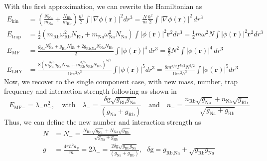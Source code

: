 With the first approximation, we can rewrite the Hamiltonian as
\begin{equation*}
\begin{split}
E_{\text{kin}}&=\left(\frac{N_{\text{Na}}}{m_{\text{Na}}} +\frac{N_{\text{Rb}}}{m_{\text{Rb}}}\right)\frac{\hbar ^2}{2}\int \left| \nabla \phi (\pmb{r})\right|^2 dr^3=\frac{N}{m} \frac{\hbar ^2}{2}\int \left| \nabla \phi (\pmb{r})\right| ^2 \, dr^3\\
E_{\text{trap}}&=\frac{1}{2}\left(m_{\text{Rb}} \omega _{\text{Rb}}^2N_{\text{Rb}}+m_{\text{Na}} \omega _{\text{Na}}^2N_{\text{Na}}\right)\int \left|\phi (\pmb{r})\right| ^2\pmb{r}^2dr^3=\frac{1}{2}m \omega ^2N\int \left| \phi (\pmb{r})\right| ^2\pmb{r}^2dr^3\\
E_{\text{MF}}&=\frac{g_{\text{Na}}N_{\text{Na}}^2+g_{\text{Rb}}N_{\text{Rb}}^2+2g_{\text{Rb},\text{Na}}N_{\text{Na}}N_{\text{Rb}}}{2}\int \left| \phi(\pmb{r})\right| ^4 \, dr^3=\frac{g}{2}N^2\int \left| \phi (\pmb{r})\right| ^4 \, dr^3\\
E_{\text{LHY}}&=\frac{8\left(m_{\text{Na}}^{3/5}g_{\text{Na}}N_{\text{Na}}+m_{\text{Rb}}^{3/5}g_{\text{Rb}}N_{\text{Rb}}\right)^{5/2}}{15\pi ^2\hbar ^3}\int\left| \phi (\pmb{r})\right| ^5dr^3=\frac{8m^{3/2}\Gamma ^{5/2}N^{5/2}}{15\pi ^2\hbar ^3}\int \left| \phi (\pmb{r})\right| ^5 dr^3
\end{split}
\end{equation*}
Now, we recover to the single component case, with new mass, number, trap frequency and interaction strength following  as shown in \cite{petrov2015}
\begin{equation}
E_{\text{MF}-}=\lambda _-n_-^2, \quad\text{with}\quad \lambda _-=\frac{\text{$\delta$g}\sqrt{g_{\text{Rb}}g_{\text{Na}}}}{\left(g_{\text{Na}}+g_{\text{Rb}}\right)}\quad\text{and}\quad n_-=\frac{n_{\text{Rb}}\sqrt{g_{\text{Na}}}+n_{\text{Na}}\sqrt{g_{\text{Rb}}}}{\sqrt{g_{\text{Na}}+g_{\text{Rb}}}}
\end{equation}
Thus, we can define the new number and interaction strength as
\begin{equation}
\begin{split}
N&=N_-=\frac{N_{\text{Rb}}\sqrt{g_{\text{Na}}}+N_{\text{Na}}\sqrt{g_{\text{Rb}}}}{\sqrt{g_{\text{Na}}+g_{\text{Rb}}}}\\
g&=\frac{4\pi  \hbar ^2a_S}{m}=2\lambda _-=\frac{2\text{$\delta $g}\sqrt{g_{\text{Rb}}g_{\text{Na}}}}{\left(g_{\text{Na}}+g_{\text{Rb}}\right)},\text{  }\text{$\delta $g}=g_{\text{Rb},\text{Na}}+\sqrt{g_{\text{Rb}}g_{\text{Na}}}
\end{split}
\end{equation}
